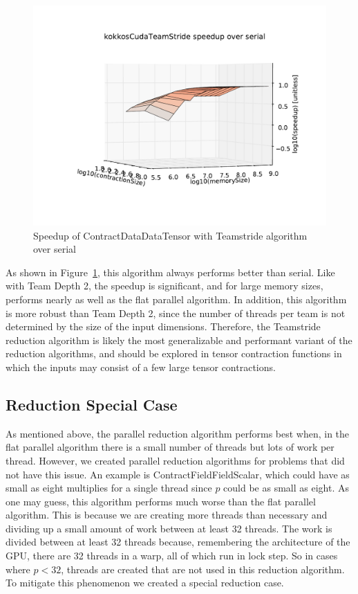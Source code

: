 \begin{figure}[ht]
    \includegraphics[scale=.55]{./VersusSerial_kokkosCudaTeamStride_clearCache_shadowfax.pdf}
\caption{Speedup of ContractDataDataTensor with Teamstride algorithm over
    serial
\label{fig:ContractDataDataTensorTeamstride}} 
\end{figure}

As shown in Figure~\ref{fig:ContractDataDataTensorTeamstride}, this algorithm
always performs better than serial.  Like with Team Depth 2, the speedup is
significant, and for large memory sizes, performs nearly as well as the flat
parallel algorithm.  In addition, this algorithm is more robust than Team Depth
2, since the number of threads per team is not determined by the size of the
input dimensions.  Therefore, the Teamstride reduction algorithm is likely the
most generalizable and performant variant of the reduction algorithms, and
should be explored in tensor contraction functions in which the inputs may
consist of a few large tensor contractions.

\subsection{Reduction Special Case}
As mentioned above, the parallel reduction algorithm performs best when, in the
flat parallel algorithm there is a small number of threads but lots of work per
thread. However, we created parallel reduction algorithms for problems that did
not have this issue. An example is ContractFieldFieldScalar, which could have
as small as eight multiplies for a single thread since $p$ could be as small as
eight. As one may guess, this algorithm performs much worse than the flat
parallel algorithm. This is because we are creating more threads than necessary
and dividing up a small amount of work between at least 32 threads. The work is
divided between at least 32 threads because, remembering the architecture of
the GPU, there are 32 threads in a warp, all of which run in lock step. So in
cases where $p < 32$, threads are created that are not used in this reduction
algorithm. To mitigate this phenomenon we created a special reduction case.

